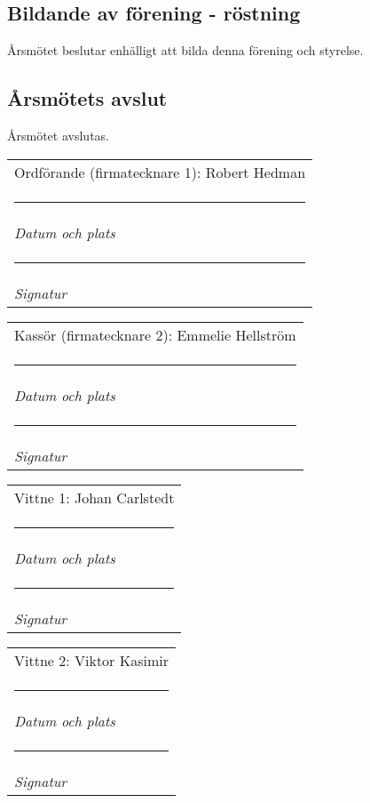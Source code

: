 \documentclass{article}
\makeatletter
\newcommand{\namesigdate}[2][5cm]{%
  \begin{tabular}{@{}p{#1}@{}}
    #2 \\[2\normalbaselineskip] \hrule \\[0pt]
    {\small \textit{Datum och plats}} \\[2\normalbaselineskip] \hrule \\[0pt]
    {\small \textit{Signatur}}
  \end{tabular}
}
\makeatother
\begin{document}
\subsection{Bildande av förening - röstning}
Årsmötet beslutar enhälligt att bilda denna förening och styrelse.
\subsection{Årsmötets avslut}
Årsmötet avslutas.

\vspace{1cm}


\noindent \namesigdate[10cm]{Ordförande (firmatecknare 1): Robert Hedman}
\vspace{0.5cm}

\noindent \namesigdate[10cm]{Kassör (firmatecknare 2): Emmelie Hellström}
\vspace{0.5cm}

\noindent \namesigdate[10cm]{Vittne 1: Johan Carlstedt}
\vspace{0.5cm}

\noindent \namesigdate[10cm]{Vittne 2: Viktor Kasimir}
\end{document}
